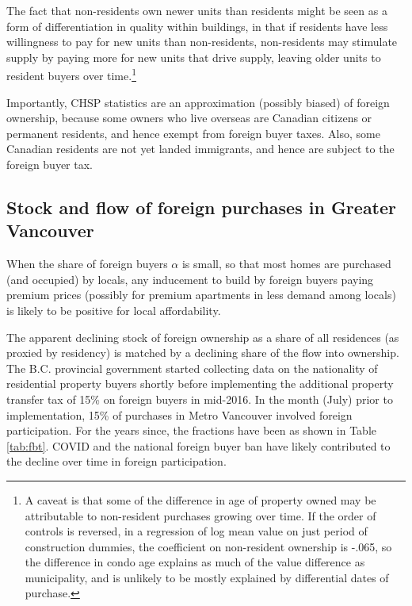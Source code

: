\documentclass[12pt]{article}
\begin{document}
The fact that non-residents own newer units than residents might be seen as a
form of differentiation in quality within buildings, in that if residents have
less willingness to pay for new units than non-residents, non-residents may
stimulate supply by paying more for new units that drive supply, leaving older
units to resident buyers over time.\footnote{A caveat is that some of the
difference in age of property owned may be attributable to non-resident
purchases growing over time. If the order of controls is reversed, in a
regression of log mean value on just period of construction dummies, the
coefficient on non-resident ownership is -.065, so the difference in condo age
explains as much of the value difference as municipality, and is unlikely to be
mostly explained by differential dates of purchase.}

Importantly, CHSP statistics are an approximation (possibly biased) of foreign
ownership, because some owners who live overseas are Canadian citizens or
permanent residents, and hence exempt from foreign buyer taxes. Also, some
Canadian residents are not yet landed immigrants, and hence are subject to the
foreign buyer tax. 

\subsection{Stock and flow of foreign purchases in Greater Vancouver}

When the share of foreign buyers $\alpha$ is small, so that most homes are
purchased (and occupied) by locals, any inducement to build by foreign buyers
paying premium prices (possibly for premium apartments in less demand among
locals) is likely to be positive for local affordability.

The apparent declining stock of foreign ownership as a share of all residences
(as proxied by residency) is matched by a declining share of the flow into
ownership. The B.C. provincial government started collecting data on the
nationality of residential property buyers shortly before implementing the
additional property transfer tax of 15\% on foreign buyers in mid-2016. In the
month (July) prior to implementation, 15\% of purchases in Metro Vancouver
involved foreign participation. For the years since, the fractions have been as
shown in Table \ref{tab:fbt}. COVID and the national foreign buyer ban have
likely contributed to the decline over time in foreign participation.
\end{document}
